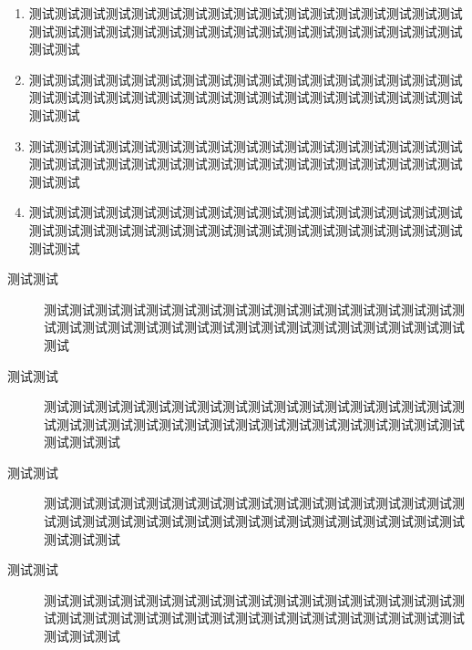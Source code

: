 \documentclass[degree=mg]{njuthesis}
\begin{document}
\begin{enumerate}
    \item 测试测试测试测试测试测试测试测试测试测试测试测试测试测试测试测试测试测试测试测试测试测试测试测试测试测试测试测试测试测试测试测试测试测试测试测试
    \item 测试测试测试测试测试测试测试测试测试测试测试测试测试测试测试测试测试测试测试测试测试测试测试测试测试测试测试测试测试测试测试测试测试测试测试测试
    \item 测试测试测试测试测试测试测试测试测试测试测试测试测试测试测试测试测试测试测试测试测试测试测试测试测试测试测试测试测试测试测试测试测试测试测试测试
    \item 测试测试测试测试测试测试测试测试测试测试测试测试测试测试测试测试测试测试测试测试测试测试测试测试测试测试测试测试测试测试测试测试测试测试测试测试
\end{enumerate}

\begin{description}
    \item[测试测试] 测试测试测试测试测试测试测试测试测试测试测试测试测试测试测试测试测试测试测试测试测试测试测试测试测试测试测试测试测试测试测试测试测试测试
    \item[测试测试] 测试测试测试测试测试测试测试测试测试测试测试测试测试测试测试测试测试测试测试测试测试测试测试测试测试测试测试测试测试测试测试测试测试测试测试测试
    \item[测试测试] 测试测试测试测试测试测试测试测试测试测试测试测试测试测试测试测试测试测试测试测试测试测试测试测试测试测试测试测试测试测试测试测试测试测试测试测试
    \item[测试测试] 测试测试测试测试测试测试测试测试测试测试测试测试测试测试测试测试测试测试测试测试测试测试测试测试测试测试测试测试测试测试测试测试测试测试测试测试
\end{description}




\printbibliography



\appendix



\end{document}
